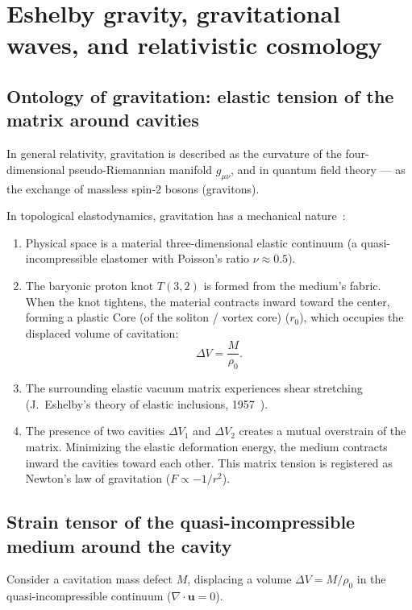 \documentclass[11pt,a4paper]{article}
\theoremstyle{definition}
\theoremstyle{remark}
\begin{document}
\section{Eshelby gravity, gravitational waves, and relativistic cosmology}

\subsection{Ontology of gravitation: elastic tension of the matrix around cavities}

In general relativity, gravitation is described as the curvature of the four-dimensional pseudo-Riemannian manifold $g_{\mu\nu}$, and in quantum field theory — as the exchange of massless spin-2 bosons (gravitons).

In topological elastodynamics, gravitation has a mechanical nature~\cite{Volovik2003}:
\begin{enumerate}
\item Physical space is a material three-dimensional elastic continuum (a quasi-incompressible elastomer with Poisson's ratio $\nu \approx 0.5$).
\item The baryonic proton knot $T(3,2)$ is formed from the medium's fabric. When the knot tightens, the material contracts inward toward the center, forming a plastic Core (of the soliton / vortex core) ($r_0$), which occupies the displaced volume of cavitation:
\begin{equation}
\Delta V = \frac{M}{\rho_0}.
\label{eq:cavitation_volume_def}
\end{equation}
\item The surrounding elastic vacuum matrix experiences shear stretching (J.~Eshelby's theory of elastic inclusions, 1957~\cite{Eshelby1957}).
\item The presence of two cavities $\Delta V_1$ and $\Delta V_2$ creates a mutual overstrain of the matrix. Minimizing the elastic deformation energy, the medium contracts inward the cavities toward each other. This matrix tension is registered as Newton's law of gravitation ($F \propto -1/r^2$).
\end{enumerate}
\subsection{Strain tensor of the quasi-incompressible medium around the cavity}

Consider a cavitation mass defect $M$, displacing a volume $\Delta V = M / \rho_0$ in the quasi-incompressible continuum ($\nabla \cdot \mathbf{u} = 0$).
\end{document}

